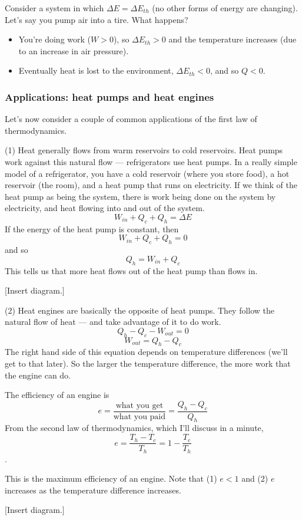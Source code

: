 Consider a system in which $\Delta{E}=\Delta{E_{th}}$ (no other forms of energy are changing). Let's say you pump air into a tire. What happens?
\begin{itemize}
\item You're doing work ($W>0$), so $\Delta{E_{th}}>0$ and the temperature increases (due to an increase in air pressure).
\item Eventually heat is lost to the environment, $\Delta{E_{th}}<0$, and so $Q<0$.
\end{itemize}

\subsubsection{Applications: heat pumps and heat engines}
Let's now consider a couple of common applications of the first law of thermodynamics.

(1) Heat generally flows from warm reservoirs to cold reservoirs. Heat pumps work against this natural flow --- refrigerators use heat pumps. In a really simple model of a refrigerator, you have a cold reservoir (where you store food), a hot reservoir (the room), and a heat pump that runs on electricity. If we think of the heat pump as being the system, there is work being done on the system by electricity, and heat flowing into and out of the system.
$$W_{in}+Q_c+Q_h=\Delta{E}$$
If the energy of the heat pump is constant, then
$$W_{in}+Q_c+Q_h=0$$
and so
$$Q_h=W_{in}+Q_c$$
This tells us that more heat flows out of the heat pump than flows in.

[Insert diagram.]
\vspace{5cm}

(2) Heat engines are basically the opposite of heat pumps. They follow the natural flow of heat --- and take advantage of it to do work.
$$Q_h-Q_c-W_{out}=0$$
$$W_{out}=Q_h-Q_c$$
The right hand side of this equation depends on temperature differences (we'll get to that later). So the larger the temperature difference, the more work that the engine can do.

The efficiency of an engine is
$$e=\frac{\mbox{what you get}}{\mbox{what you paid}}=\frac{Q_h-Q_c}{Q_h}$$
From the second law of thermodynamics, which I'll discuss in a minute,
$$e=\frac{T_h-T_c}{T_h}=1-\frac{T_c}{T_h}$$.

This is the maximum efficiency of an engine. Note that (1) $e<1$ and (2) $e$ increases as the temperature difference increases.

[Insert diagram.]
\vspace{5cm}


